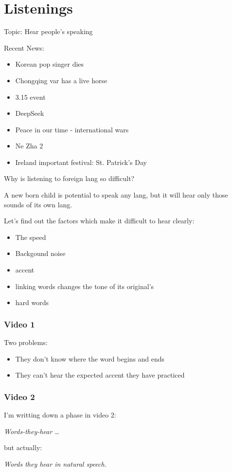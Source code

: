 \section{Listenings}%
\label{sec:Listenings}

Topic: Hear people's speaking

Recent News:
\begin{itemize}
    \item Korean pop singer dies
    \item Chongqing var has a live horse
    \item 3.15 event
    \item DeepSeek
    \item Peace in our time - international wars
    \item Ne Zha 2
    \item Ireland important festival: St. Patrick's Day
\end{itemize}
Why is listening to foreign lang so difficult?
\begin{notation}
    A new born child is potential to speak any lang, but it will hear only those sounds of its own lang.
\end{notation}
Let's find out the factors which make it difficult to hear clearly:
\begin{itemize}
    \item The speed
    \item Backgound noise
    \item accent
    \item linking words changes the tone of its original's
    \item hard words
\end{itemize}
\subsubsection*{Video 1}%
\label{subsub*:Video-1}
Two problems:
\begin{itemize}
    \item They don't know where the word begins and ends
    \item They can't hear the expected accent they have practiced
\end{itemize}
\subsubsection*{Video 2}%
\label{subsub*:Video-2}
I'm writting down a phase in video 2:
\begin{notation}
\textit{Words-they-hear \ldots }
\end{notation}
but actually: 
\begin{notation}
\textit{Words they hear in natural speech.}
\end{notation}
